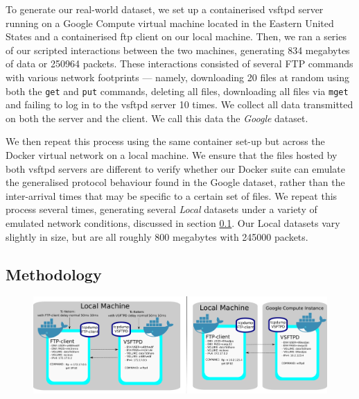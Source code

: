 \documentclass[msc,deptreport, cs]{infthesis} %
\begin{document}
To generate our real-world dataset, we set up a containerised vsftpd server running on a Google Compute virtual machine located in the Eastern United States and a containerised ftp client on our local machine. Then, we ran a series of our scripted interactions between the two machines, generating 834 megabytes of data or 250964 packets. These interactions consisted of several FTP commands with various network footprints --- namely, downloading 20 files at random using both the \texttt{get} and \texttt{put} commands, deleting all files, downloading all files via \texttt{mget} and failing to log in to the vsftpd server 10 times. We collect all data transmitted on both the server and the client. We call this data the \textit{Google} dataset.

We then repeat this process using the same container set-up but across the Docker virtual network on a local machine. We ensure that the files hosted by both vsftpd servers are different to verify whether our Docker suite can emulate the generalised protocol behaviour found in the Google dataset, rather than the inter-arrival times that may be specific to a certain set of files. We repeat this process several times, generating several \textit{Local} datasets under a variety of emulated network conditions, discussed in section \ref{sec:method1}. Our Local datasets vary slightly in size, but are all roughly 800 megabytes with 245000 packets.


\subsection{Methodology}
\label{sec:method1}

\begin{figure}[h!]
\centering
\includegraphics[width=14cm]{ftp_example_cloud.png}
\caption{}
\end{figure}
\end{document}
